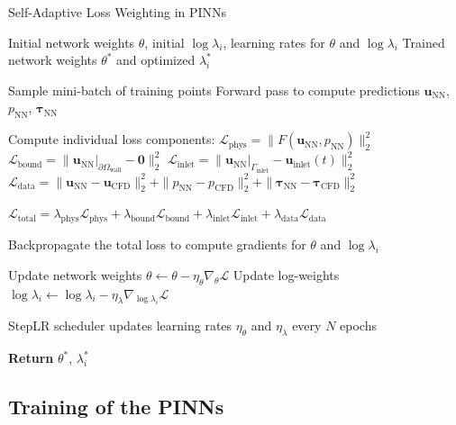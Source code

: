 \documentclass{article}
\begin{document}
\begin{algorithm}[htbp]
    \caption{Self-Adaptive Loss Weighting in PINNs}
    \label{alg:self_adaptive_weighting}
    \begin{algorithmic}[1]
    \Require Initial network weights $\theta$, initial $\log \lambda_i$, learning rates for $\theta$ and $\log \lambda_i$
    \Ensure Trained network weights $\theta^*$ and optimized $\lambda_i^*$
    
        \State Sample mini-batch of training points
        \State Forward pass to compute predictions $\mathbf{u}_{\mathrm{NN}}$, $p_{\mathrm{NN}}$, $\boldsymbol{\tau}_{\mathrm{NN}}$
        
        \State Compute individual loss components:
            \State \quad $\mathcal{L}_{\mathrm{phys}} = \|F(\mathbf{u}_{\mathrm{NN}}, p_{\mathrm{NN}})\|_2^2$
            \State \quad $\mathcal{L}_{\mathrm{bound}} = \|\mathbf{u}_{\mathrm{NN}}|_{\partial\Omega_{\mathrm{wall}}} - \mathbf{0}\|_2^2$
            \State \quad $\mathcal{L}_{\mathrm{inlet}} = \|\mathbf{u}_{\mathrm{NN}}|_{\Gamma_{\mathrm{inlet}}} - \mathbf{u}_{\mathrm{inlet}}(t)\|_2^2$
            \State \quad $\mathcal{L}_{\mathrm{data}} = \|\mathbf{u}_{\mathrm{NN}} - \mathbf{u}_{\mathrm{CFD}}\|_2^2 + \|p_{\mathrm{NN}} - p_{\mathrm{CFD}}\|_2^2 + \|\boldsymbol{\tau}_{\mathrm{NN}} - \boldsymbol{\tau}_{\mathrm{CFD}}\|_2^2$
        
        \State \quad $\mathcal{L}_{\mathrm{total}} = \lambda_{\mathrm{phys}} \mathcal{L}_{\mathrm{phys}} + \lambda_{\mathrm{bound}} \mathcal{L}_{\mathrm{bound}} + \lambda_{\mathrm{inlet}} \mathcal{L}_{\mathrm{inlet}} + \lambda_{\mathrm{data}} \mathcal{L}_{\mathrm{data}}$
        
        \State Backpropagate the total loss to compute gradients for $\theta$ and $\log \lambda_i$
        
        \State Update network weights $\theta \gets \theta - \eta_{\theta} \nabla_{\theta} \mathcal{L}$
        \State Update log-weights $\log \lambda_i \gets \log \lambda_i - \eta_{\lambda} \nabla_{\log \lambda_i} \mathcal{L}$
        
        \State StepLR scheduler updates learning rates $\eta_{\theta}$ and $\eta_{\lambda}$ every $N$ epochs
    \EndWhile
    
    \State \textbf{Return} $\theta^*$, $\lambda_i^*$
    \end{algorithmic}
\end{algorithm}

\subsection{Training of the PINNs}
\end{document}
